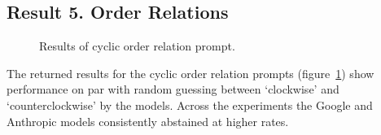 \subsection{Result 5. Order Relations}

\begin{figure}
    \centering
    
    \caption{Results of cyclic order relation prompt. }
    \label{fig:order}
\end{figure}

The returned results for the cyclic order relation prompts (figure~\ref{fig:order}) show performance on par with random guessing between `clockwise' and `counterclockwise' by the models.
Across the experiments the Google and Anthropic models consistently abstained at higher rates.











